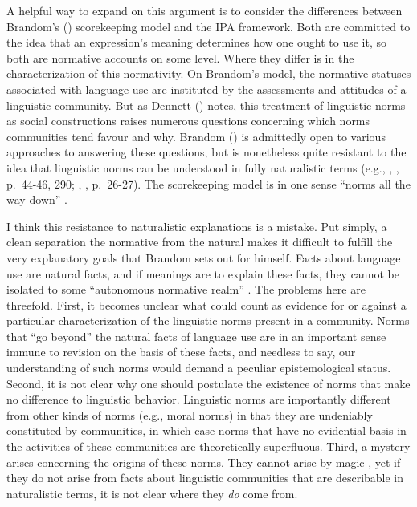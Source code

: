 A helpful way to expand on this argument is to consider the differences between Brandom's (\citeyear{Brandom:1994}) scorekeeping model and the IPA framework. Both are committed to the idea that an expression's meaning determines how one ought to use it, so both are normative accounts on some level. Where they differ is in the characterization of this normativity. On Brandom's model, the normative statuses associated with language use are instituted by the assessments and attitudes of a linguistic community. But as Dennett (\citeyear{Dennett:2010}) notes, this treatment of linguistic norms as social constructions raises numerous questions concerning which norms communities tend favour and why. Brandom (\citeyear{Brandom:2010}) is admittedly open to various approaches to answering these questions, but is nonetheless quite resistant to the idea that linguistic norms can be understood in fully naturalistic terms (e.g., \citeauthor{Brandom:1994}, \citeyear{Brandom:1994}, p.~44-46, 290; \citeauthor{Brandom:2000}, \citeyear{Brandom:2000}, p.~26-27). The scorekeeping model is in one sense ``norms all the way down'' \citep[][p. 44]{Brandom:1994}.

I think this resistance to naturalistic explanations is a mistake. Put simply, a clean separation the normative from the natural makes it difficult to fulfill the very explanatory goals that Brandom sets out for himself. Facts about language use are natural facts, and if meanings are to explain these facts, they cannot be isolated to some ``autonomous normative realm'' \citep[][p. 133]{Horwich:2005}. The problems here are threefold. First, it becomes unclear what could count as evidence for or against a particular characterization of the linguistic norms present in a community. Norms that ``go beyond'' the natural facts of language use are in an important sense immune to revision on the basis of these facts, and needless to say, our understanding of such norms would demand a peculiar epistemological status. Second, it is not clear why one should postulate the existence of norms that make no difference to linguistic behavior. Linguistic norms are importantly different from other kinds of norms (e.g., moral norms) in that they are undeniably constituted by communities, in which case norms that have no evidential basis in the activities of these communities are theoretically superfluous. Third, a mystery arises concerning the origins of these norms. They cannot arise by magic \citep{Dennett:2010}, yet if they do not arise from facts about linguistic communities that are describable in naturalistic terms, it is not clear where they \textit{do} come from. 

